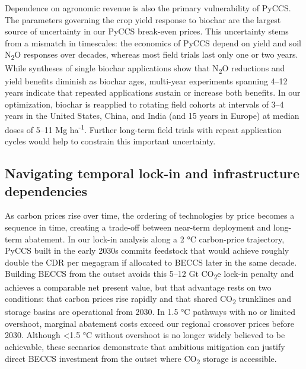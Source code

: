 \documentclass[
  letterpaper,
  twoside,
  twocolumn,
  9pt]{article}
\begin{document}
Dependence on agronomic revenue is also the primary vulnerability of
PyCCS. The parameters governing the crop yield response to biochar are
the largest source of uncertainty in our PyCCS break-even prices. This
uncertainty stems from a mismatch in timescales: the economics of PyCCS
depend on yield and soil N\textsubscript{2}O responses over decades,
whereas most field trials last only one or two years.\citep{kaur2023}
While syntheses of single biochar applications show that
N\textsubscript{2}O reductions and yield benefits diminish as biochar
ages,\citep{borchard2019, kaur2023, yang2025biochar} multi-year
experiments spanning 4--12 years indicate that repeated applications
sustain or increase both benefits.\citep{yang2025biochar} In our
optimization, biochar is reapplied to rotating field cohorts at
intervals of 3--4 years in the United States, China, and India (and 15
years in Europe) at median doses of 5--11 Mg ha\textsuperscript{-1}.
Further long-term field trials with repeat application cycles would help
to constrain this important uncertainty.

\subsection{Navigating temporal lock-in and infrastructure
dependencies}\label{navigating-temporal-lock-in-and-infrastructure-dependencies}

As carbon prices rise over time, the ordering of technologies by price
becomes a sequence in time, creating a trade-off between near-term
deployment and long-term abatement. In our lock-in analysis along a 2 °C
carbon-price trajectory, PyCCS built in the early 2030s commits
feedstock that would achieve roughly double the CDR per megagram if
allocated to BECCS later in the same decade. Building BECCS from the
outset avoids this 5--12 Gt CO\textsubscript{2}e lock-in penalty and
achieves a comparable net present value, but that advantage rests on two
conditions: that carbon prices rise rapidly and that shared
CO\textsubscript{2} trunklines and storage basins are operational from
2030. In 1.5 °C pathways with no or limited overshoot,\citep{riahi2022}
marginal abatement costs exceed our regional crossover prices before
2030. Although \textless1.5 °C without overshoot is no longer widely
believed to be
achievable,\citep{lenton2025global, matthews2022current, tavoni2026implications}
these scenarios demonstrate that ambitious mitigation can justify direct
BECCS investment from the outset where CO\textsubscript{2} storage is
accessible.
\end{document}
